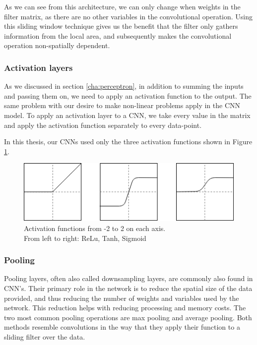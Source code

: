 As we can see from this architecture, we can only change when weights in the filter matrix, as there are no other variables in the convolutional operation. Using this sliding window technique gives us the benefit that the filter only gathers information from the local area, and subsequently makes the convolutional operation non-spatially dependent.  

\subsubsection{Activation layers}
As we discussed in section \ref{cha:perceptron}, in addition to summing the inputs and passing them on, we need to apply an activation function to the output. The same problem with our desire to make non-linear problems apply in the CNN model. 
To apply an activation layer to a CNN, we take every value in the matrix and apply the activation function separately to every data-point. 

In this thesis, our CNNs used only the three activation functions shown in Figure \ref{fig:activations}.
\begin{figure}[h]
        \centering
        \includegraphics[scale=0.8]{background/figures/activations.png}
        \caption{Activation functions from -2 to 2 on each axis. \\ From left to right: ReLu, Tanh, Sigmoid}
        \label{fig:activations}
\end{figure}

\subsubsection{Pooling}
Pooling layers, often also called downsampling layers, are commonly also found in CNN's. 
Their primary role in the network is to reduce the spatial size of the data provided, and thus reducing the number of weights and variables used by the network. This reduction helps with reducing processing and memory costs.  
The two most common pooling operations are max pooling and average pooling. Both methods resemble convolutions in the way that they apply their function to a sliding filter over the data. 
 
